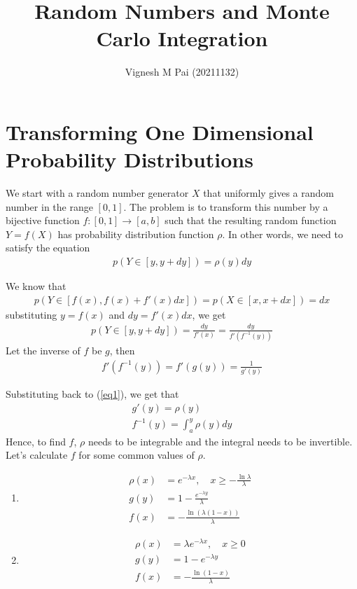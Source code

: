 \documentclass{article}
\title{Random Numbers and Monte Carlo Integration}
\author{Vignesh M Pai (20211132)}
\date{}
\begin{document}
\maketitle

\section{Transforming One Dimensional Probability Distributions}

We start with a random number generator $X$ that uniformly gives a random number in the
range $[0, 1]$. The problem is to transform this number by a bijective function $f: [0, 1] \to [a, b]$ such that the resulting
random function $Y=f(X)$ has probability distribution function $\rho$. In other words, we need to satisfy the equation
\begin{align}\label{eq1}
    p(Y \in [y, y + dy]) = \rho(y) dy
\end{align}

We know that
\begin{align}
    p(Y \in [f(x), f(x) + f'(x) dx]) = p(X \in [x, x + dx]) = dx
\end{align}
substituting $y = f(x)$ and $dy = f'(x) dx$, we get
\begin{align}
    p(Y \in [y, y + dy]) = \frac{dy}{f'(x)} = \frac{dy}{f'(f^{-1}(y))}
\end{align}
Let the inverse of $f$ be $g$, then
\begin{align}
    f'(f^{-1}(y)) = f'(g(y)) = \frac{1}{g'(y)}
\end{align}

Substituting back to (\ref{eq1}), we get that
\begin{gather*}
    g'(y) = \rho(y) \\
    f^{-1}(y) = \int_a^y \rho(y) dy
\end{gather*}
Hence, to find $f$, $\rho$ needs to be integrable and the integral needs to be invertible.
Let's calculate $f$ for some common values of $\rho$.

\begin{enumerate}
    \item
    \begin{align*}
        \rho(x) &= e^{-\lambda x},\quad x \geq - \frac{\ln{\lambda}}{\lambda} \\
        g(y) &= 1 - \frac{e^{-\lambda y}}{\lambda} \\
        f(x) &= - \frac{\ln(\lambda(1- x))}{\lambda}     
    \end{align*}
    \item
    \begin{align*}
        \rho(x) &= \lambda e^{-\lambda x},\quad x \geq 0 \\
        g(y) &= 1 - e^{-\lambda y} \\
        f(x) &= - \frac{\ln(1- x)}{\lambda}  
    \end{align*}
\end{enumerate}
\end{document}
